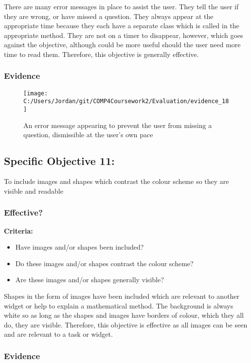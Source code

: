There are many error messages in place to assist the user. They tell the user if they are wrong, or have missed a question. They always appear at the appropriate time because they each have a separate class which is called in the appropriate method. They are not on a timer to disappear, however, which goes against the objective, although could be more useful should the user need more time to read them. Therefore, this objective is generally effective.

\subsubsection{Evidence}

\begin{figure}[H]
	\texttt{[image: C:/Users/Jordan/git/COMP4Coursework2/Evaluation/evidence\_18]}
	\caption{An error message appearing to prevent the user from missing a question, dismissible at the user's own pace}
\end{figure}

\subsection{Specific Objective 11: }

To include images and shapes which contrast the colour scheme so they are visible and readable

\subsubsection{Effective?}

\textbf{Criteria: }

\begin{itemize}
	\item Have images and/or shapes been included?
	\item Do these images and/or shapes contrast the colour scheme?
	\item Are these images and/or shapes generally visible?
\end{itemize}

Shapes in the form of images have been included which are relevant to another widget or help to explain a mathematical method. The background is always white so as long as the shapes and images have borders of colour, which they all do, they are visible. Therefore, this objective is effective as all images can be seen and are relevant to a task or widget.

\subsubsection{Evidence}

